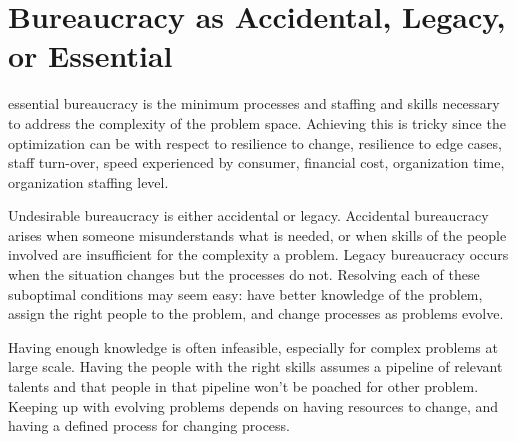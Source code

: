 \section{Bureaucracy as Accidental, Legacy, or Essential}
\gls{essential bureaucracy} is the minimum processes and staffing and skills necessary to address the complexity of the problem space. Achieving this is tricky since the optimization can be with respect to resilience to change, resilience to edge cases, staff turn-over, speed experienced by consumer, financial cost, organization time, organization staffing level.

Undesirable bureaucracy is either accidental or legacy. Accidental bureaucracy arises when someone misunderstands what is needed, or when skills of the people involved are insufficient for the complexity a problem. Legacy bureaucracy occurs when the situation changes but the processes do not. Resolving each of these suboptimal conditions may seem easy: have better knowledge of the problem, assign the right people to the problem, and change processes as problems evolve. 

Having enough knowledge is often infeasible, especially for complex problems at large scale. Having the people with the right skills assumes a pipeline of relevant talents and that people in that pipeline won't be poached for other problem. Keeping up with evolving problems depends on having resources to change, and having a defined process for changing process. 